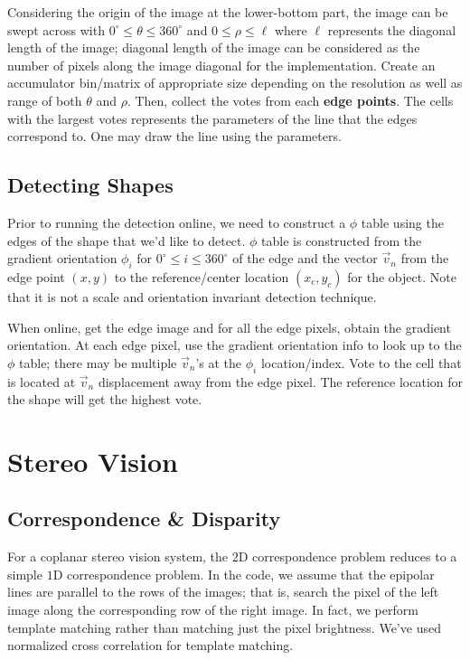 \documentclass{report}
\begin{document}
Considering the origin of the image at the lower-bottom part, the image can be swept across with $0^{\circ} \leq \theta \leq 360^{\circ}$ and $0 \leq \rho \leq \ell$ where $\ell$ represents the diagonal length of the image; diagonal length of the image can be considered as the number of pixels along the image diagonal for the implementation. Create an accumulator bin/matrix of appropriate size depending on the resolution as well as range of both $\theta$ and $\rho$. Then, collect the votes from each \textbf{edge points}. The cells with the largest votes represents the parameters of the line that the edges correspond to. One may draw the line using the parameters.


\subsection{Detecting Shapes}
\hspace{\parindent}Prior to running the detection online, we need to construct a $\phi$ table using the edges of the shape that we'd like to detect. $\phi$ table is constructed from the gradient orientation $\phi_i$ for $0^\circ \leq i \leq 360^\circ$ of the edge and the vector $\vec v_n$ from the edge point $(x, y)$ to the reference/center location $(x_c, y_c)$ for the object. Note that it is not a scale and orientation invariant detection technique.

When online, get the edge image and for all the edge pixels, obtain the gradient orientation. At each edge pixel, use the gradient orientation info to look up to the $\phi$ table; there may be multiple $\vec v_n$'s at the $\phi_i$ location/index. Vote to the cell that is located at $\vec v_n$ displacement away from the edge pixel. The reference location for the shape will get the highest vote.



\section{Stereo Vision}
\subsection{Correspondence \& Disparity}
\hspace{\parindent}For a coplanar stereo vision system, the $2$D correspondence problem reduces to a simple $1$D correspondence problem. In the code, we assume that the epipolar lines are parallel to the rows of the images; that is, search the pixel of the left image along the corresponding row of the right image. In fact, we perform template matching rather than matching just the pixel brightness. We've used normalized cross correlation for template matching.



\end{document}

